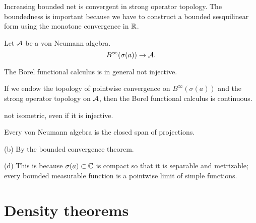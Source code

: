 \documentclass{../../large}
\begin{document}
\begin{prb}
Increasing bounded net is convergent in strong operator topology.
The boundedness is important because we have to construct a bounded sesquilinear form using the monotone convergence in $\mathbb{R}$.
\end{prb}




\begin{prb}
Let $\mathcal{A}$ be a von Neumann algebra.
\[B^\infty(\sigma(a))\to\mathcal{A}.\]
\begin{parts}
\item The Borel functional calculus is in general not injective.
\item If we endow the topology of pointwise convergence on $B^\infty(\sigma(a))$ and the strong operator topology on $\mathcal{A}$, then the Borel functional calculus is continuous.
\item not isometric, even if it is injective.
\item Every von Neumann algebra is the closed span of projections.
\end{parts}
\end{prb}
\begin{prb}

(b)
By the bounded convergence theorem.

(d)
This is because $\sigma(a)\subset\mathbb{C}$ is compact so that it is separable and metrizable; every bounded measurable function is a pointwise limit of simple functions.

\end{prb}



\section{Density theorems}
\end{document}
